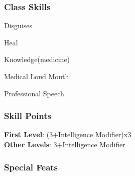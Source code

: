 \documentclass[ letterpaper,12pt]{article}
\begin{document}
\subsubsection{Class Skills}
\begin{itemize}
{\it 
\item{Disguises}
\item{Heal}
\item{Knowledge(medicine)}
\item{Medical Loud Mouth}
\item{Professional Speech}
}
\end{itemize}

\subsubsection{Skill Points}
{\bf First Level}: (3+Intelligence Modifier)x3\\
{\bf Other Levels}: 3+Intelligence Modifier\\

\subsubsection{Special Feats}
\end{document}

